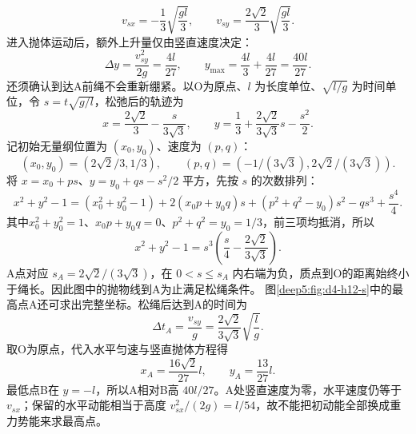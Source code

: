 \begin{solution}
\begin{equation}
 v_{sx}=-\frac13\sqrt{\frac{gl}{3}},\qquad
 v_{sy}=\frac{2\sqrt2}{3}\sqrt{\frac{gl}{3}}.
\end{equation}
进入抛体运动后，额外上升量仅由竖直速度决定：
\begin{equation}
 \Delta y=\frac{v_{sy}^2}{2g}=\frac{4l}{27},\qquad
 y_{\max}=\frac{4l}{3}+\frac{4l}{27}=\frac{40l}{27}.
\end{equation}
还须确认到达A前绳不会重新绷紧。以O为原点、$l$ 为长度单位、$\sqrt{l/g}$ 为时间单位，令 $s=t\sqrt{g/l}$，松弛后的轨迹为
\begin{equation}
 x=\frac{2\sqrt2}{3}-\frac{s}{3\sqrt3},\qquad
 y=\frac13+\frac{2\sqrt2}{3\sqrt3}s-\frac{s^2}{2}.
\end{equation}
记初始无量纲位置为 $(x_0,y_0)$、速度为 $(p,q)$：
\[
(x_0,y_0)=(2\sqrt2/3,1/3),\qquad
(p,q)=(-1/(3\sqrt3),2\sqrt2/(3\sqrt3)).
\]
将 $x=x_0+ps$、$y=y_0+qs-s^2/2$ 平方，先按 $s$ 的次数排列：
\[
x^2+y^2-1=(x_0^2+y_0^2-1)+2(x_0p+y_0q)s
+(p^2+q^2-y_0)s^2-qs^3+\frac{s^4}{4}.
\]
其中$x_0^2+y_0^2=1$、$x_0p+y_0q=0$、$p^2+q^2=y_0=1/3$，前三项均抵消，所以
\begin{equation}
 x^2+y^2-1=s^3\left(\frac s4-\frac{2\sqrt2}{3\sqrt3}\right).
\end{equation}
A点对应 $s_A=2\sqrt2/(3\sqrt3)$，在 $0<s\le s_A$ 内右端为负，质点到O的距离始终小于绳长。因此图中的抛物线到A为止满足松绳条件。
图\ref{deep5:fig:d4-h12-s}中的最高点A还可求出完整坐标。松绳后达到A的时间为
\[
\Delta t_A=\frac{v_{sy}}g
=\frac{2\sqrt2}{3\sqrt3}\sqrt{\frac lg}.
\]
取O为原点，代入水平匀速与竖直抛体方程得
\[
x_A=\frac{16\sqrt2}{27}l,\qquad y_A=\frac{13}{27}l.
\]
最低点B在 $y=-l$，所以A相对B高 $40l/27$。A处竖直速度为零，水平速度仍等于 $v_{sx}$；保留的水平动能相当于高度 $v_{sx}^2/(2g)=l/54$，故不能把初动能全部换成重力势能来求最高点。

\end{solution}


